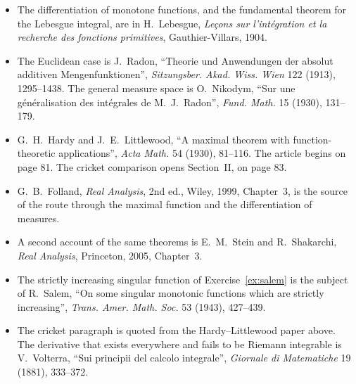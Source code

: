 \begin{itemize}
\item The differentiation of monotone functions, and the fundamental theorem for the Lebesgue integral, are in H.~Lebesgue, \emph{Le\c cons sur l'int\'egration et la recherche des fonctions primitives}, Gauthier-Villars, 1904.
\item The Euclidean case is J.~Radon, ``Theorie und Anwendungen der absolut additiven Mengenfunktionen'', \emph{Sitzungsber. Akad. Wiss. Wien} 122 (1913), 1295--1438. The general measure space is O.~Nikodym, ``Sur une g\'en\'eralisation des int\'egrales de M.~J.~Radon'', \emph{Fund. Math.} 15 (1930), 131--179.
\item G.~H.~Hardy and J.~E.~Littlewood, ``A maximal theorem with function-theoretic applications'', \emph{Acta Math.} 54 (1930), 81--116. The article begins on page 81. The cricket comparison opens Section~II, on page 83.
\item G.~B.~Folland, \emph{Real Analysis}, 2nd ed., Wiley, 1999, Chapter~3, is the source of the route through the maximal function and the differentiation of measures.
\item A second account of the same theorems is E.~M.~Stein and R.~Shakarchi, \emph{Real Analysis}, Princeton, 2005, Chapter~3.
\item The strictly increasing singular function of Exercise~\ref{ex:salem} is the subject of R.~Salem, ``On some singular monotonic functions which are strictly increasing'', \emph{Trans. Amer. Math. Soc.} 53 (1943), 427--439.
\item The cricket paragraph is quoted from the Hardy--Littlewood paper above. The derivative that exists everywhere and fails to be Riemann integrable is V.~Volterra, ``Sui principii del calcolo integrale'', \emph{Giornale di Matematiche} 19 (1881), 333--372.
\end{itemize}
